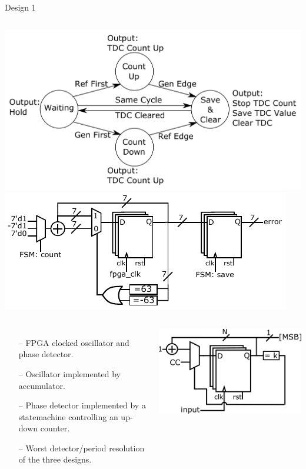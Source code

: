 \documentclass{beamer}
\begin{document}
\begin{frame}{Design 1}
\vspace{-0.67 cm}

\begin{columns}
	\includegraphics[width=1\linewidth]{../state_trans_new}
	\includegraphics[width=1\linewidth]{../updown}
\end{columns}
\begin{columns}
	\begin{itemize}
		\item[--]
		FPGA clocked oscillator and phase detector.
		\item[--]
		Oscillator implemented by accumulator.
		\item[--]
		Phase detector implemented by a statemachine controlling an up-down counter.
		\item[--]
		Worst detector/period resolution of the three designs.
	\end{itemize}
	\includegraphics[width=1\linewidth]{../osc1}
\end{columns}


\end{frame}
\end{document}

